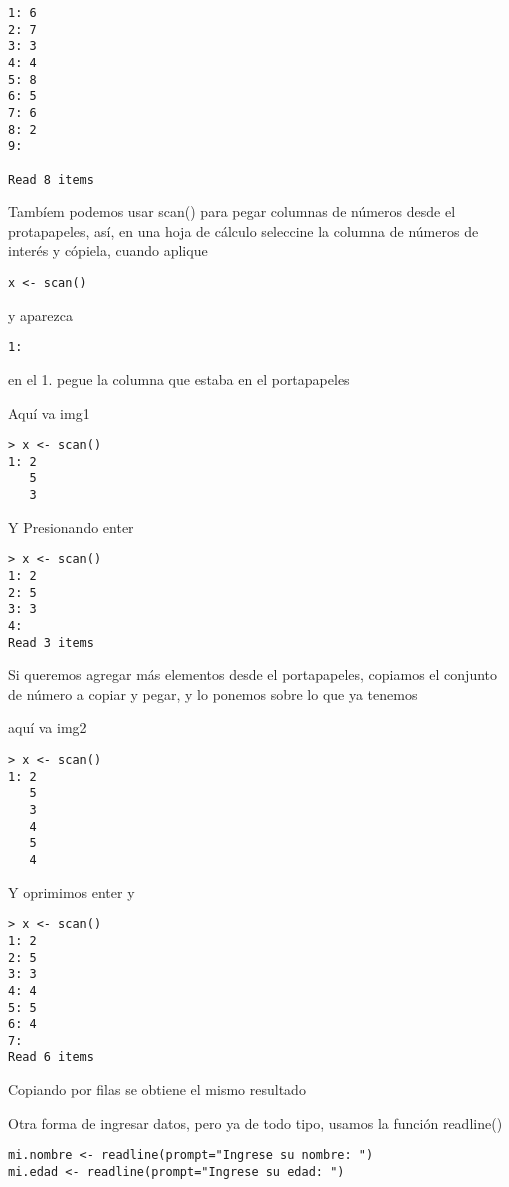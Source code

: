 \documentclass[]{article}
\begin{document}
\begin{verbatim}
1: 6
2: 7
3: 3
4: 4
5: 8
6: 5
7: 6
8: 2
9:

Read 8 items
\end{verbatim}

Tambíem podemos usar scan() para pegar columnas de números desde el
protapapeles, así, en una hoja de cálculo seleccine la columna de
números de interés y cópiela, cuando aplique

\begin{verbatim}
x <- scan()
\end{verbatim}

y aparezca

\begin{verbatim}
1:
\end{verbatim}

en el 1. pegue la columna que estaba en el portapapeles

Aquí va img1

\begin{verbatim}
> x <- scan()
1: 2
   5
   3
\end{verbatim}

Y Presionando enter

\begin{verbatim}
> x <- scan()
1: 2
2: 5
3: 3
4: 
Read 3 items
\end{verbatim}

Si queremos agregar más elementos desde el portapapeles, copiamos el
conjunto de número a copiar y pegar, y lo ponemos sobre lo que ya
tenemos

aquí va img2

\begin{verbatim}
> x <- scan()
1: 2
   5
   3
   4
   5
   4
\end{verbatim}

Y oprimimos enter y

\begin{verbatim}
> x <- scan()
1: 2
2: 5
3: 3
4: 4
5: 5
6: 4
7: 
Read 6 items
\end{verbatim}

Copiando por filas se obtiene el mismo resultado

Otra forma de ingresar datos, pero ya de todo tipo, usamos la función
readline()

\begin{verbatim}
mi.nombre <- readline(prompt="Ingrese su nombre: ")
mi.edad <- readline(prompt="Ingrese su edad: ")
\end{verbatim}
\end{document}
